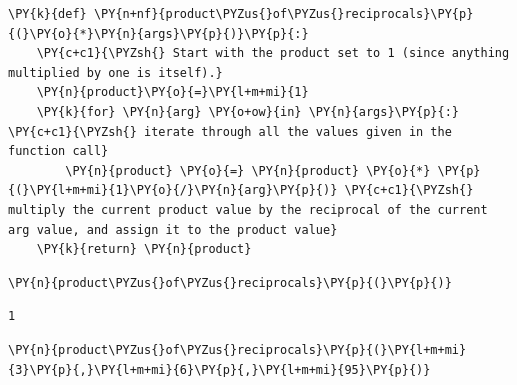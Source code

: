     \begin{tcolorbox}[breakable, size=fbox, boxrule=1pt, pad at break*=1mm,colback=cellbackground, colframe=cellborder]
\begin{Verbatim}[commandchars=\\\{\}]
\PY{k}{def} \PY{n+nf}{product\PYZus{}of\PYZus{}reciprocals}\PY{p}{(}\PY{o}{*}\PY{n}{args}\PY{p}{)}\PY{p}{:}
    \PY{c+c1}{\PYZsh{} Start with the product set to 1 (since anything multiplied by one is itself).}
    \PY{n}{product}\PY{o}{=}\PY{l+m+mi}{1}
    \PY{k}{for} \PY{n}{arg} \PY{o+ow}{in} \PY{n}{args}\PY{p}{:} \PY{c+c1}{\PYZsh{} iterate through all the values given in the function call}
        \PY{n}{product} \PY{o}{=} \PY{n}{product} \PY{o}{*} \PY{p}{(}\PY{l+m+mi}{1}\PY{o}{/}\PY{n}{arg}\PY{p}{)} \PY{c+c1}{\PYZsh{} multiply the current product value by the reciprocal of the current arg value, and assign it to the product value}
    \PY{k}{return} \PY{n}{product}
\end{Verbatim}
\end{tcolorbox}

    \begin{tcolorbox}[breakable, size=fbox, boxrule=1pt, pad at break*=1mm,colback=cellbackground, colframe=cellborder]
\begin{Verbatim}[commandchars=\\\{\}]
\PY{n}{product\PYZus{}of\PYZus{}reciprocals}\PY{p}{(}\PY{p}{)}
\end{Verbatim}
\end{tcolorbox}

            \begin{tcolorbox}[breakable, size=fbox, boxrule=.5pt, pad at break*=1mm, opacityfill=0]
\begin{Verbatim}[commandchars=\\\{\}]
1
\end{Verbatim}
\end{tcolorbox}
        
    \begin{tcolorbox}[breakable, size=fbox, boxrule=1pt, pad at break*=1mm,colback=cellbackground, colframe=cellborder]
\begin{Verbatim}[commandchars=\\\{\}]
\PY{n}{product\PYZus{}of\PYZus{}reciprocals}\PY{p}{(}\PY{l+m+mi}{3}\PY{p}{,}\PY{l+m+mi}{6}\PY{p}{,}\PY{l+m+mi}{95}\PY{p}{)}
\end{Verbatim}
\end{tcolorbox}

